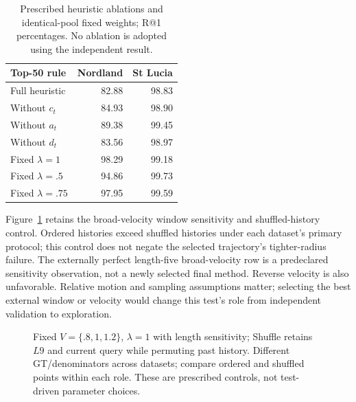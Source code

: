 \documentclass[conference]{IEEEtran}
\begin{document}
\begin{table}[t]\centering\small
\caption{Prescribed heuristic ablations and identical-pool fixed weights; R@1 percentages. No ablation is adopted using the independent result.}\label{tab:ablations}
\begin{tabular}{lrr}\toprule
Top-50 rule & Nordland & St Lucia\\\midrule
Full heuristic & 82.88 & 98.83\\
Without $c_t$ & 84.93 & 98.90\\
Without $a_t$ & 89.38 & 99.45\\
Without $d_t$ & 83.56 & 98.97\\
Fixed $\lambda=1$ & 98.29 & 99.18\\
Fixed $\lambda=.5$ & 94.86 & 99.73\\
Fixed $\lambda=.75$ & 97.95 & 99.59\\
\bottomrule\end{tabular}\end{table}

Figure~\ref{fig:sequence} retains the broad-velocity window sensitivity and shuffled-history control. Ordered histories exceed shuffled histories under each dataset's primary protocol; this control does not negate the selected trajectory's tighter-radius failure. The externally perfect length-five broad-velocity row is a predeclared sensitivity observation, not a newly selected final method. Reverse velocity is also unfavorable. Relative motion and sampling assumptions matter; selecting the best external window or velocity would change this test's role from independent validation to exploration.

\begin{figure}[t]\centering
{}
\caption{Fixed $V=\{.8,1,1.2\}$, $\lambda=1$ with length sensitivity; Shuffle retains $L9$ and current query while permuting past history. Different GT/denominators across datasets; compare ordered and shuffled points within each role. These are prescribed controls, not test-driven parameter choices.}\label{fig:sequence}
\end{figure}
\end{document}
